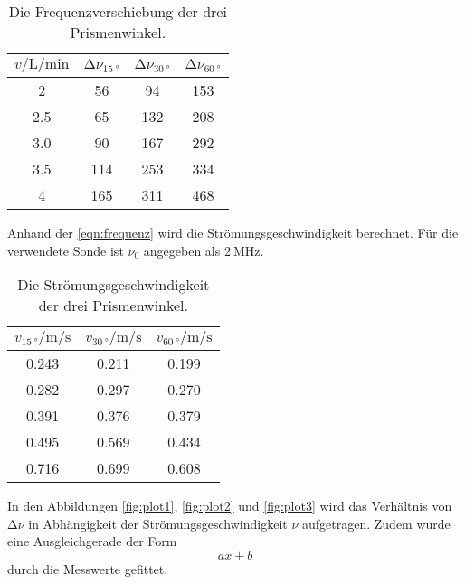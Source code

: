 \begin{table}[H]
    \centering
    \caption{Die Frequenzverschiebung der drei Prismenwinkel.}
    \label{tab:messwerte1}
\begin{tabular}{c c c c}
    \toprule
     $v / \si{\liter\per\minute}$ & $ \increment \nu_{\qty{15}{°}}$ & $\increment \nu_{\qty{30}{°}}$ & $\increment \nu_{\qty{60}{°}}$ \\
    \midrule
       2 &  56 &  94 & 153 \\
     2.5 &  65 & 132 & 208 \\
     3.0 &  90 & 167 & 292 \\
     3.5 & 114 & 253 & 334 \\
       4 & 165 & 311 & 468 \\
    \bottomrule
\end{tabular}
\end{table}

Anhand der \autoref{eqn:frequenz} wird die Strömungsgeschwindigkeit berechnet. Für die verwendete Sonde ist 
$\nu_0$ angegeben als $\SI{2}{\mega\hertz}$.

\begin{table}[H]
    \centering
    \caption{Die Strömungsgeschwindigkeit der drei Prismenwinkel.}
    \label{tab:geschw}
\begin{tabular}{c c c}
    \toprule
     $v_{\qty{15}{°}} / \si{\meter \per \second}$ &  $v_{\qty{30}{°}} / \si{\meter \per \second}$ &  $v_{\qty{60}{°}} / \si{\meter \per \second}$ \\
    \midrule
       0.243 &    0.211 &    0.199 \\
       0.282 &    0.297 &    0.270 \\
       0.391 &    0.376 &    0.379 \\
       0.495 &    0.569 &    0.434 \\
       0.716 &    0.699 &    0.608 \\
    \bottomrule
    \end{tabular}
\end{table}

In den Abbildungen \ref{fig:plot1}, \ref{fig:plot2} und \ref{fig:plot3} wird das Verhältnis von $\increment \nu$ in Abhängigkeit der Strömungsgeschwindigkeit
$\nu$ aufgetragen. Zudem wurde eine Ausgleichgerade der Form 
\begin{equation*}
  a x + b 
\end{equation*}
durch die Messwerte gefittet.

